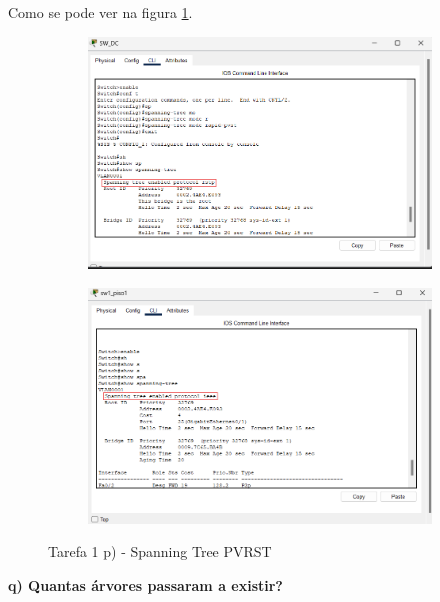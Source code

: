 \documentclass[11pt,english, openright, oneside]{book}
\begin{document}
Como se pode ver na figura \ref{fig:1p}.
\vspace{0.4cm}
\begin{figure}[h]
    \centering
    \begin{subfigure}{.53\textwidth}
        \centering
        \includegraphics[width=0.99\linewidth]{imagens/Tarefa1/1.p.png}
    \end{subfigure}%
    \begin{subfigure}{.53\textwidth}
        \centering
        \includegraphics[width=0.99\linewidth]{imagens/Tarefa1/1.p.2.png}
    \end{subfigure}
    \caption{Tarefa 1 p) - Spanning Tree PVRST}
    \label{fig:1p}
\end{figure}
\vspace{0.8cm}


\textbf{q) Quantas árvores passaram a existir?}
\vspace{0.2cm}
\end{document}
